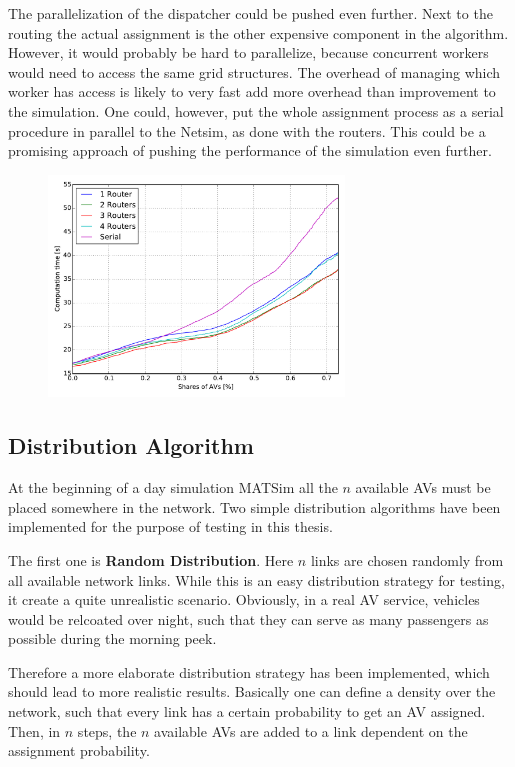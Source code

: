 The parallelization of the dispatcher could be pushed even further. Next to the
routing the actual assignment is the other expensive component in the algorithm.
However, it would probably be hard to parallelize, because concurrent workers
would need to access the same grid structures. The overhead of managing which
worker has access is likely to very fast add more overhead than improvement to
the simulation. One could, however, put the whole assignment process as a serial
procedure in parallel to the Netsim, as done with the routers. This could be a
promising approach of pushing the performance of the simulation even further.

\begin{figure}
    \centering
    \includegraphics[width=0.7\textwidth]{figures/routers.pdf}
    \caption{}
    \label{fig:routers}
\end{figure}

\subsection{Distribution Algorithm}

At the beginning of a day simulation MATSim all the $n$ available AVs must be placed
somewhere in the network. Two simple distribution algorithms have been implemented
for the purpose of testing in this thesis.

The first one is \textbf{Random Distribution}. Here $n$ links are chosen randomly
from all available network links. While this is an easy distribution strategy for testing,
it create a quite unrealistic scenario. Obviously, in a real AV service, vehicles
would be relcoated over night, such that they can serve as many passengers as
possible during the morning peek.

Therefore a more elaborate distribution strategy has been implemented, which should
lead to more realistic results. Basically one can define a density over the network,
such that every link has a certain probability to get an AV assigned. Then, in $n$
steps, the $n$ available AVs are added to a link dependent on the assignment
probability.

